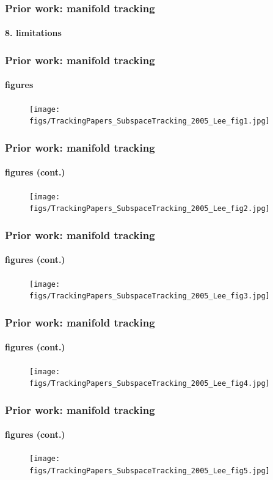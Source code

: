 \begin{frame}
\frametitle{Prior work: manifold tracking}
\framesubtitle{8. limitations}
\logoCSIPCPL\mypagenum
{}
\end{frame}

\begin{frame}
\frametitle{Prior work: manifold tracking}
\framesubtitle{figures}
\logoCSIPCPL\mypagenum
	\begin{figure}
		\texttt{[image: figs/TrackingPapers\_SubspaceTracking\_2005\_Lee\_fig1.jpg]}
	\end{figure}
\end{frame}


\begin{frame}
\frametitle{Prior work: manifold tracking}
\framesubtitle{figures (cont.)}
\logoCSIPCPL\mypagenum
	\begin{figure}
		\texttt{[image: figs/TrackingPapers\_SubspaceTracking\_2005\_Lee\_fig2.jpg]}
	\end{figure}
\end{frame}



\begin{frame}
\frametitle{Prior work: manifold tracking}
\framesubtitle{figures (cont.)}
\logoCSIPCPL\mypagenum
	\begin{figure}
		\texttt{[image: figs/TrackingPapers\_SubspaceTracking\_2005\_Lee\_fig3.jpg]}
	\end{figure}
\end{frame}


\begin{frame}
\frametitle{Prior work: manifold tracking}
\framesubtitle{figures (cont.)}
\logoCSIPCPL\mypagenum
	\begin{figure}
		\texttt{[image: figs/TrackingPapers\_SubspaceTracking\_2005\_Lee\_fig4.jpg]}
	\end{figure}
\end{frame}


\begin{frame}
\frametitle{Prior work: manifold tracking}
\framesubtitle{figures (cont.)}
\logoCSIPCPL\mypagenum
	\begin{figure}
		\texttt{[image: figs/TrackingPapers\_SubspaceTracking\_2005\_Lee\_fig5.jpg]}
	\end{figure}
\end{frame}




